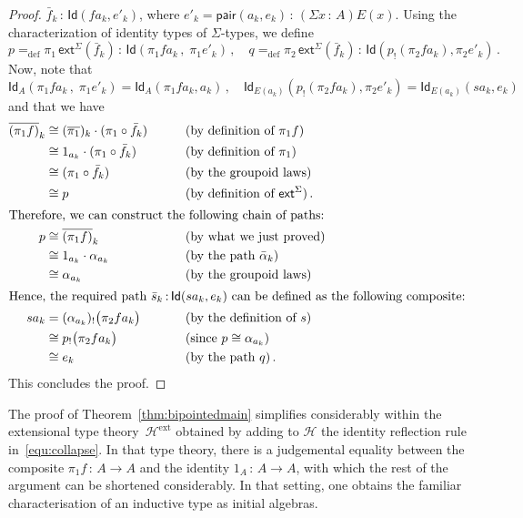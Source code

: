 \documentclass[10pt,a4paper,oneside,reqno]{amsart}
\numberwithin{equation}{section}
\theoremstyle{mythm}
\theoremstyle{mydef}
\theoremstyle{myrmk}
\newcommand{\deq}{=}
\newcommand{\defeq}{=_{\mathrm{def}}}
\newcommand{\co}{\,{:}\,}
\newcommand{\iso}{\cong}
\newcommand{\ct}{\cdot}
\newcommand{\Hint}{\mathcal{H}}
\newcommand{\Hext}{\mathcal{H}^{\mathrm{ext}}}
\newcommand{\ext}{\mathsf{ext}}
\newcommand{\Id}{\mathsf{Id}}
\newcommand{\pair}{\mathsf{pair}}
\begin{document}
\begin{proof}
$\bar{f}_k \co \Id( f a_k, e'_k)$, where $e'_k = \pair(a_k, e_k) \co (\Sigma x \co A) E(x)$. Using the 
characterization of identity types of $\Sigma$-types, we define
\[
p \defeq \pi_1 \, \ext^\Sigma(\bar{f}_k)  \co  \Id( \pi_1 f  a_k \, ,\;   \pi_1 e'_k )  \, ,  \quad 
q \defeq  \pi_2 \, \ext^\Sigma(\bar{f}_k) \co   \Id( p_{!}( \pi_2 f  a_k), \pi_2 e'_k)   \, .
\]
Now, note that
\[
 \Id_A( \pi_1 f  a_k \, ,\;   \pi_1 e'_k )  = \Id_A(\pi_1 f a_k, a_k) \, , \quad 
 \Id_{E(a_k)}( p_{!}( \pi_2 f  a_k), \pi_2 e'_k)  = \Id_{E(a_k)}( sa_k, e_k) 
 \]
and that we have 
\begin{alignat*}{4}  
\overline{(\pi_1  f)}_k  & \iso  (\overline{\pi_1})_k \ct (\pi_1 \circ \bar{f}_k)  & & \qquad (\text{by definition of } \pi_1 f)   \\
& \iso  1_{a_k}  \ct (\pi_1 \circ \bar{f}_k)  & & \qquad (\text{by definition of } \pi_1)  \\
 & \iso (\pi_1 \circ \bar{f}_k) & & \qquad (\text{by the groupoid laws}) \\
 & \iso p  & & \qquad (\text{by definition of } \ext^\Sigma) \,  . \\
 \intertext{Therefore, we can construct the following chain of paths:}
p & \iso  \overline{(\pi_1 f)}_k & &  \qquad (\text{by what we just proved})  \\
  & \iso 1_{a_k} \ct  \alpha_{a_k}  & &  \qquad (\text{by the path } \bar{\alpha}_k ) \\ 
  & \iso  \alpha_{a_k}  & & \qquad (\text{by the groupoid laws}) \\
\intertext{Hence,  the required path $\bar{s}_k \co  \Id(s a_k,  e_k)$ can be defined as the following composite:}
s a_k & \deq (\alpha_{a_k})_{!} \big( \pi_2 f a_k   \big) & & \qquad (\text{by the definition of } s) \\
 &              \iso  p_{!} \big( \pi_2 f a_k   \big) & & \qquad (\text{since } p  \iso \alpha_{a_k}) \\
   &            \iso  e_k  & &  \qquad (\text{by the path } q)  \, .
   \end{alignat*} 
   This concludes the proof.
\end{proof}


The proof of Theorem~\ref{thm:bipointedmain} simplifies considerably within the extensional
type theory~$\Hext$ obtained by adding to $\Hint$ the identity reflection rule in~\eqref{equ:collapse}. In that type theory, 
there is a judgemental equality 
between the composite $\pi_1 f \co A \to A$ and the identity $1_A \co A \to A$, with which the
rest of the argument can be shortened considerably. In that setting, one obtains the familiar characterisation 
of an inductive type as initial algebras.
\end{document}
